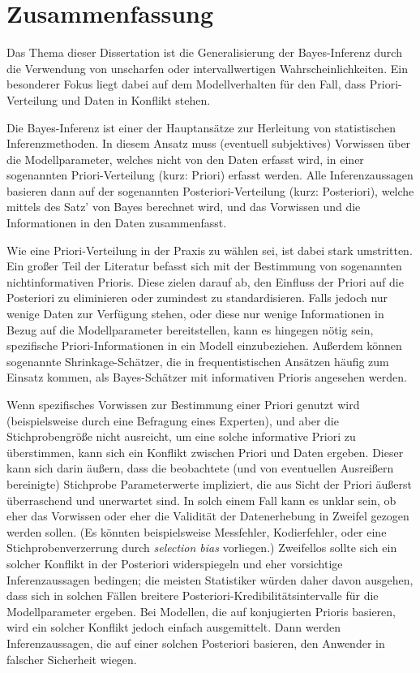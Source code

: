 \chapter*{Zusammenfassung}

Das Thema dieser Dissertation ist die Generalisierung der Bayes-Inferenz
durch die Verwendung von unscharfen oder intervallwertigen Wahrscheinlichkeiten.
Ein besonderer Fokus liegt dabei auf dem Modellverhalten für den Fall,
dass Priori-Verteilung und Daten in Konflikt stehen.

Die Bayes-Inferenz ist einer der Hauptansätze zur Herleitung von statistischen Inferenzmethoden.
In diesem Ansatz muss (eventuell subjektives) Vorwissen über die Modellparameter,
welches nicht von den Daten erfasst wird, in einer sogenannten Priori-Verteilung (kurz: Priori) erfasst werden.
Alle Inferenzaussagen basieren dann auf der sogenannten Posteriori-Verteilung (kurz: Posteriori),
welche mittels des Satz' von Bayes berechnet wird, 
und das Vorwissen und die Informationen in den Daten zusammenfasst.

Wie eine Priori-Verteilung in der Praxis zu wählen sei, ist dabei stark umstritten.
Ein großer Teil der Literatur befasst sich mit der Bestimmung von sogenannten
nichtinformativen Prioris. Diese zielen darauf ab, den Einfluss der Priori auf die Posteriori
zu eliminieren oder zumindest zu standardisieren.
Falls jedoch nur wenige Daten zur Verfügung stehen, oder diese nur wenige Informationen
in Bezug auf die Modellparameter bereitstellen,
kann es hingegen nötig sein, spezifische Priori-Informationen in ein Modell einzubeziehen.
Außerdem können sogenannte Shrinkage-Schätzer, die in frequentistischen Ansätzen häufig zum Einsatz kommen,
als Bayes-Schätzer mit informativen Prioris angesehen werden.

Wenn spezifisches Vorwissen zur Bestimmung einer Priori genutzt wird (beispielsweise durch eine Befragung eines Experten),
und aber die Stichprobengröße nicht ausreicht, um eine solche informative Priori zu überstimmen,
kann sich ein Konflikt zwischen Priori und Daten ergeben.
Dieser kann sich darin äußern, dass die beobachtete (und von eventuellen Ausreißern bereinigte)
Stichprobe Parameterwerte impliziert, die aus Sicht der Priori äußerst überraschend und unerwartet sind.
In solch einem Fall kann es unklar sein, ob eher das Vorwissen oder eher die Validität der
Datenerhebung in Zweifel gezogen werden sollen.
(Es könnten beispielsweise Messfehler, Kodierfehler, oder eine Stichprobenverzerrung durch \emph{selection bias} vorliegen.)
Zweifellos sollte sich ein solcher Konflikt in der Posteriori widerspiegeln
und eher vorsichtige Inferenzaussagen bedingen;
die meisten Statistiker würden daher davon ausgehen,
dass sich in solchen Fällen breitere Posteriori-Kredibilitätsintervalle für die Modellparameter ergeben.
Bei Modellen, die auf konjugierten Prioris basieren,
wird ein solcher Konflikt jedoch einfach ausgemittelt.
Dann werden Inferenzaussagen, die auf einer solchen Posteriori basieren, den Anwender in falscher Sicherheit wiegen.

